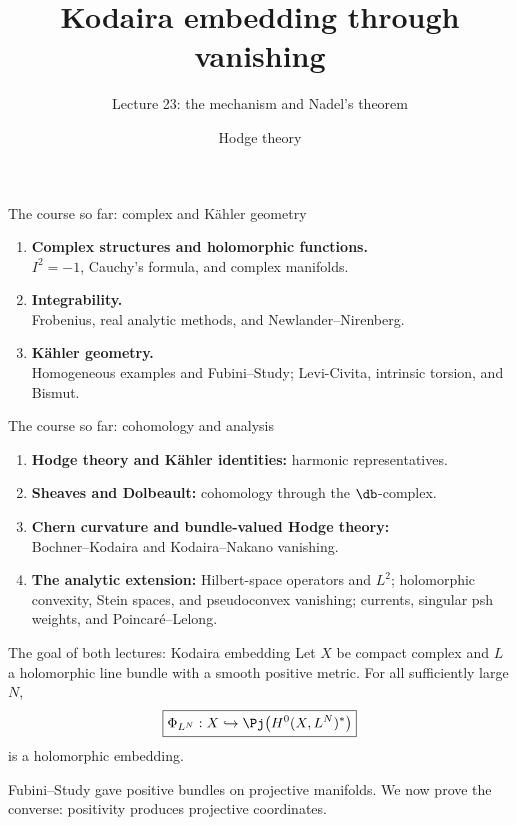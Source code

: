 
\title{Kodaira embedding through vanishing}
\subtitle{Lecture 23: the mechanism and Nadel's theorem}
\date{Hodge theory}

\begin{frame}\titlepage\end{frame}
\begin{frame}{The course so far: complex and Kähler geometry}
\begin{enumerate}
\setlength{\itemsep}{12pt}
\item \textbf{Complex structures and holomorphic functions.}\\
\(I^2=-1\), Cauchy's formula, and complex manifolds.
\item \textbf{Integrability.}\\
Frobenius, real analytic methods, and Newlander--Nirenberg.
\item \textbf{Kähler geometry.}\\
Homogeneous examples and Fubini--Study; Levi-Civita, intrinsic torsion, and Bismut.
\end{enumerate}
\end{frame}

\begin{frame}{The course so far: cohomology and analysis}
\begin{enumerate}
\setlength{\itemsep}{9pt}
\item \textbf{Hodge theory and Kähler identities:} harmonic representatives.
\item \textbf{Sheaves and Dolbeault:} cohomology through the \(\db\)-complex.
\item \textbf{Chern curvature and bundle-valued Hodge theory:}\\
Bochner--Kodaira and Kodaira--Nakano vanishing.
\item \textbf{The analytic extension:} Hilbert-space operators and \(L^2\);
holomorphic convexity, Stein spaces, and pseudoconvex vanishing;
currents, singular psh weights, and Poincaré--Lelong.
\end{enumerate}
\end{frame}

\begin{frame}{The goal of both lectures: Kodaira embedding}
Let \(X\) be compact complex and \(L\) a holomorphic line bundle with a smooth positive metric.
For all sufficiently large \(N\),
\[
\boxed{\Phi_{L^N}:X\hookrightarrow
\Pj\bigl(H^0(X,L^N)^*\bigr)}
\]
is a holomorphic embedding.
\par\bigskip
Fubini--Study gave positive bundles on projective manifolds.
We now prove the converse: positivity produces projective coordinates.
\end{frame}

